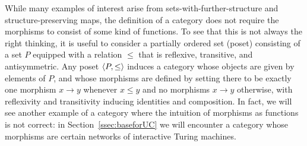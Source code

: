 While many examples of interest arise from sets-with-further-structure and structure-preserving maps, the definition of a category does not require the morphisms to consist of some kind of functions. To see that this is not always the right thinking, it is useful to consider a partially ordered set (poset) consisting of a set $P$ equipped with a relation $\leq$ that is reflexive, transitive, and antisymmetric. Any poset $\mathopen{\langle}P,\leq\mathclose{\rangle}$ induces a category whose objects are given by elements of $P$, and whose morphisms are defined by setting there to be exactly one morphism $x\to y$ whenever $x\leq y$ and no morphisms $x\to y$ otherwise, with reflexivity and transitivity inducing identities and composition. In fact, we will see another example of a category where the intuition of morphisms as functions is not correct: in Section~\ref{ssec:baseforUC} we will encounter a category whose morphisms are certain networks of interactive Turing machines. 

